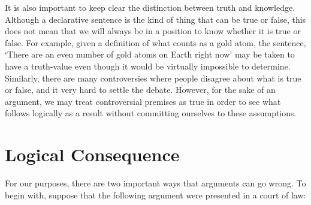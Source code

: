 
It is also important to keep clear the distinction between truth and knowledge.
Although a declarative sentence is the kind of thing that can be true or false, this does not mean that we will always be in a position to know whether it is true or false.
For example, given a definition of what counts as a gold atom, the sentence, `There are an even number of gold atoms on Earth right now' may be taken to have a truth-value even though it would be virtually impossible to determine.
Similarly, there are many controversies where people disagree about what is true or false, and it very hard to settle the debate.
However, for the sake of an argument, we may treat controversial premises as true in order to see what follows logically as a result without committing ourselves to these assumptions.






\section{Logical Consequence}
  \label{sec:LogicalConsequence}

For our purposes, there are two important ways that arguments can go wrong.
To begin with, suppose that the following argument were presented in a court of law:

